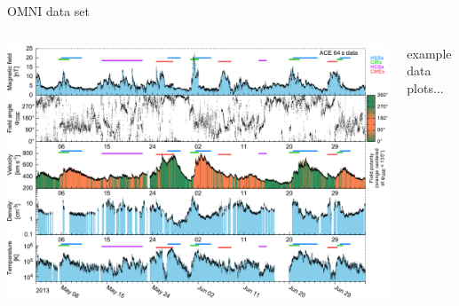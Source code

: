 \begin{frame}[c]{OMNI data set}{}
	\begin{columns}[c]
		
		\includegraphics[width=\textwidth]{../figures_of_mine/gnuplots/ACE_64s_v7_thesis_CIRs_2013-5-1_65_plot.pdf}

		example data plots...
		
		
		
	\end{columns}
\end{frame}

